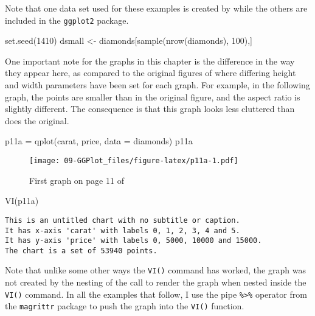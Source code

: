 \documentclass[
]{book}
\newenvironment{Shaded}{\begin{snugshade}}{\end{snugshade}}
\newcommand{\AttributeTok}[1]{\textcolor[rgb]{0.77,0.63,0.00}{#1}}
\newcommand{\DecValTok}[1]{\textcolor[rgb]{0.00,0.00,0.81}{#1}}
\newcommand{\FunctionTok}[1]{\textcolor[rgb]{0.00,0.00,0.00}{#1}}
\newcommand{\NormalTok}[1]{#1}
\newcommand{\OtherTok}[1]{\textcolor[rgb]{0.56,0.35,0.01}{#1}}
\begin{document}
Note that one data set used for these examples is created by \citet{Wickham2009ggplot2} while the others are included in the \texttt{ggplot2} package.

\begin{Shaded}
\begin{Highlighting}[]
\FunctionTok{set.seed}\NormalTok{(}\DecValTok{1410}\NormalTok{)}
\NormalTok{dsmall }\OtherTok{\textless{}{-}}\NormalTok{ diamonds[}\FunctionTok{sample}\NormalTok{(}\FunctionTok{nrow}\NormalTok{(diamonds), }\DecValTok{100}\NormalTok{),]   }
\end{Highlighting}
\end{Shaded}

One important note for the graphs in this chapter is the difference in the way they appear here, as compared to the original figures of \citet{Wickham2009ggplot2} where differing height and width parameters have been set for each graph. For example, in the following graph, the points are smaller than in the original figure, and the aspect ratio is slightly different. The consequence is that this graph looks less cluttered than does the original.

\begin{Shaded}
\begin{Highlighting}[]
\NormalTok{p11a }\OtherTok{=} \FunctionTok{qplot}\NormalTok{(carat, price, }\AttributeTok{data =}\NormalTok{ diamonds)   }
\NormalTok{p11a}
\end{Highlighting}
\end{Shaded}

\begin{figure}
\centering
\texttt{[image: 09-GGPlot\_files/figure-latex/p11a-1.pdf]}
\caption{\label{fig:p11a}First graph on page 11 of \citet{Wickham2009ggplot2}}
\end{figure}

\begin{Shaded}
\begin{Highlighting}[]
\FunctionTok{VI}\NormalTok{(p11a)  }
\end{Highlighting}
\end{Shaded}

\begin{verbatim}
This is an untitled chart with no subtitle or caption.
It has x-axis 'carat' with labels 0, 1, 2, 3, 4 and 5.
It has y-axis 'price' with labels 0, 5000, 10000 and 15000.
The chart is a set of 53940 points.
\end{verbatim}

Note that unlike some other ways the \texttt{VI()} command has worked, the graph was not created by the nesting of the call to render the graph when nested inside the \texttt{VI()} command. In all the examples that follow, I use the pipe \texttt{\%\textgreater{}\%} operator from the \texttt{magrittr} package to push the graph into the \texttt{VI()} function.
\end{document}
